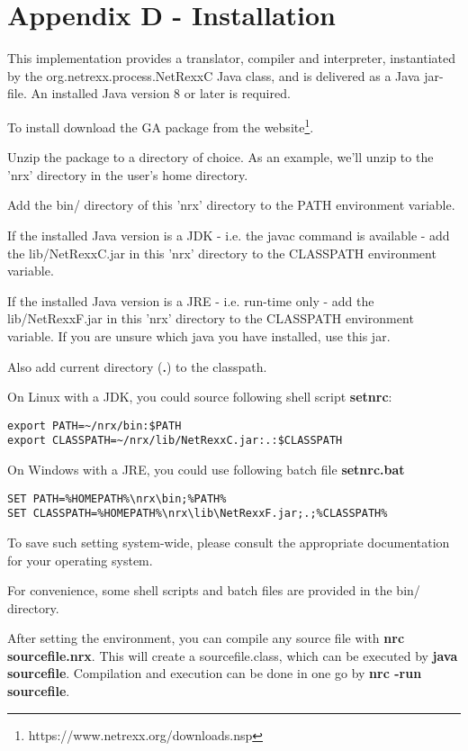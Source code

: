 \chapter{Appendix D - Installation}\label{installation}

This \nr{} implementation provides a translator, compiler and interpreter, instantiated by the 
org.netrexx.process.NetRexxC Java class, and is delivered as a Java jar-file. An installed Java version 8 or later is required.

To install \nr{} download the GA package from the \nr{} website\footnote{https://www.netrexx.org/downloads.nsp}.

Unzip the package to a directory of choice. As an example, we'll unzip to the 'nrx' directory in the user's home directory.

Add the bin/ directory of this 'nrx' directory to the PATH environment variable.

If the installed Java version is a JDK - i.e. the javac command is available - add the lib/NetRexxC.jar in this 'nrx' directory to the CLASSPATH environment variable.

If the installed Java version is a JRE - i.e. run-time only - add the lib/NetRexxF.jar in this 'nrx' directory to the CLASSPATH environment variable. If you are unsure which java you have installed, use this jar.

Also add current directory (\textbf{.}) to the classpath.

On Linux with a JDK, you could source following shell script \textbf{setnrc}:

\begin{lstlisting}
export PATH=~/nrx/bin:$PATH
export CLASSPATH=~/nrx/lib/NetRexxC.jar:.:$CLASSPATH
\end{lstlisting}

On Windows with a JRE, you could use following batch file \textbf{setnrc.bat}

\begin{lstlisting}
SET PATH=%HOMEPATH%\nrx\bin;%PATH%
SET CLASSPATH=%HOMEPATH%\nrx\lib\NetRexxF.jar;.;%CLASSPATH%
\end{lstlisting}

To save such setting system-wide, please consult the appropriate documentation for your operating system.


For convenience, some shell scripts and batch files are provided in the bin/ directory.

After setting the environment, you can compile any \nr{} source file with \textbf{nrc sourcefile.nrx}. This will create a sourcefile.class, which can be executed by \textbf{java sourcefile}.
Compilation and execution can be done in one go by \textbf{nrc -run sourcefile}.

